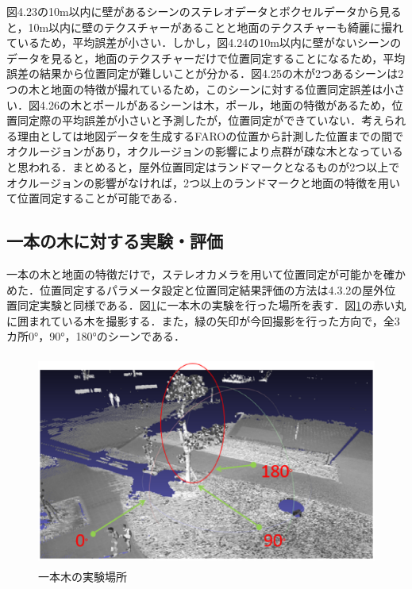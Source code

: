 \newpage

図4.23の10m以内に壁があるシーンのステレオデータとボクセルデータから見ると，10m以内に壁のテクスチャーがあることと地面のテクスチャーも綺麗に撮れているため，平均誤差が小さい．しかし，図4.24の10m以内に壁がないシーンのデータを見ると，地面のテクスチャーだけで位置同定することになるため，平均誤差の結果から位置同定が難しいことが分かる．図4.25の木が2つあるシーンは2つの木と地面の特徴が撮れているため，このシーンに対する位置同定誤差は小さい．図4.26の木とポールがあるシーンは木，ポール，地面の特徴があるため，位置同定際の平均誤差が小さいと予測したが，位置同定ができていない．考えられる理由としては地図データを生成するFAROの位置から計測した位置までの間でオクルージョンがあり，オクルージョンの影響により点群が疎な木となっていると思われる．まとめると，屋外位置同定はランドマークとなるものが2つ以上でオクルージョンの影響がなければ，2つ以上のランドマークと地面の特徴を用いて位置同定することが可能である．

\subsection{一本の木に対する実験・評価}
一本の木と地面の特徴だけで，ステレオカメラを用いて位置同定が可能かを確かめた．位置同定するパラメータ設定と位置同定結果評価の方法は4.3.2の屋外位置同定実験と同様である．図{\ref{一本木の実験場所}}に一本木の実験を行った場所を表す．図{\ref{一本木の実験場所}}の赤い丸に囲まれている木を撮影する．また，緑の矢印が今回撮影を行った方向で，全3カ所0°，90°，180°のシーンである．
%
\begin{figure}[htbp]
  \begin{center}
   \includegraphics[height=70mm]{figure/一本木の実験場所.eps}
   \caption{一本木の実験場所}
   \label{一本木の実験場所}
  \end{center}
\end{figure}
%

